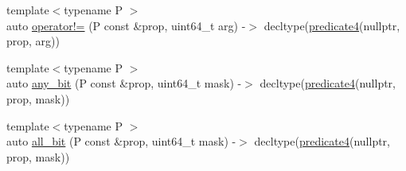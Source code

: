 \begin{DoxyCompactItemize}
\item 
{\footnotesize template$<$typename P $>$ }\\auto \hyperlink{namespacepfq__lang_a982f7b6137536d7e75fe9b2c13d581d4}{operator!=} (P const \&prop, uint64\-\_\-t arg) -\/$>$ decltype(\hyperlink{namespacepfq__lang_a1a9064340f4197e3dd4109a849a224dc}{predicate4}(nullptr, prop, arg))
\item 
{\footnotesize template$<$typename P $>$ }\\auto \hyperlink{namespacepfq__lang_a9e93958b1fecbd660154947b474ffd05}{any\-\_\-bit} (P const \&prop, uint64\-\_\-t mask) -\/$>$ decltype(\hyperlink{namespacepfq__lang_a1a9064340f4197e3dd4109a849a224dc}{predicate4}(nullptr, prop, mask))
\item 
{\footnotesize template$<$typename P $>$ }\\auto \hyperlink{namespacepfq__lang_a424b5bd6563ed52fd84807def8ba2f5f}{all\-\_\-bit} (P const \&prop, uint64\-\_\-t mask) -\/$>$ decltype(\hyperlink{namespacepfq__lang_a1a9064340f4197e3dd4109a849a224dc}{predicate4}(nullptr, prop, mask))
\end{DoxyCompactItemize}


